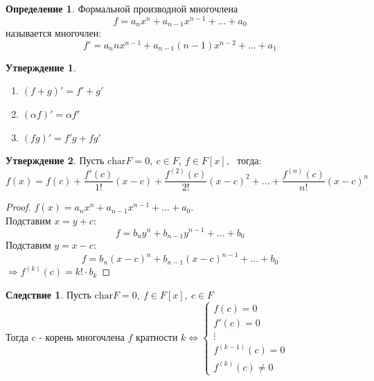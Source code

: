 \documentclass[a4paper, 12pt]{article}
\newcommand\tab[1][.5cm]{\hspace*{#1}}
\theoremstyle{definition}
\newtheorem*{definition}{Определение}
\newtheorem*{consequense}{Следствие}
\newtheorem*{subtheorem}{Утверждение}
\begin{document}
  \begin{definition}
    Формальной производной многочлена 
    $$f = a_nx^n + a_{n-1}x^{n-1} + ... + a_0$$
    называется многочлен:
    $$f' = a_nnx^{n-1} + a_{n-1}(n-1)x^{n-2} + ... + a_1$$  
  \end{definition}
  \begin{subtheorem}\tab
    \begin{enumerate}
      \item $(f+g)' = f'+g'$
      \item $(\alpha f)' = \alpha f'$
      \item $(fg)' = f'g+fg'$   
    \end{enumerate}
  \end{subtheorem}
  \begin{subtheorem}
    Пусть $\textrm{char} F = 0, \ c \in F, \ f \in F[x]$, \ тогда: 
    $$f(x)=f(c) + \frac{f'(c)}{1!}(x-c) + \frac{f^{(2)}(c)}{2!}(x-c)^2 + ... + \frac{f^{(n)}(c)}{n!}(x-c)^n$$ 
  \end{subtheorem}
  \begin{proof}
    $f(x) = a_nx^n + a_{n-1}x^{n-1} + ... + a_0$.\\ Подставим $x = y+c$: 
    $$f = b_ny^n + b_{n-1}y^{n-1} + ... + b_0$$
    Подставим $y = x - c$:
    $$f = b_n(x-c)^n + b_{n-1}(x-c)^{n-1} + ... + b_0$$ 
    $\Longrightarrow f^{(k)}(c) = k! \cdot b_k$
  \end{proof}
  \begin{consequense}
    Пусть $\textrm{char} F = 0, \ f \in F[x], \ c\in F$\\
    Тогда $c$ - корень многочлена $f$ кратности $k \Longleftrightarrow \begin{cases}
      f(c) = 0\\
      f'(c) = 0\\
      \vdots \\
      f^{(k-1)}(c) = 0\\
      f^{(k)}(c) \neq 0
    \end{cases}$    
  \end{consequense}    
\end{document}
